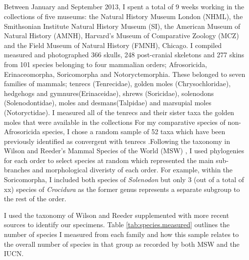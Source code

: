 \subsection{}

	Between January and September 2013, I spent a total of 9 weeks working in the collections of five museums: the Natural History Museum London (NHML), the Smithsonian Institute Natural History Museum (SI), the American Museum of Natural History (AMNH), Harvard’s Museum of Comparative Zoology (MCZ) and the Field Museum of Natural History (FMNH), Chicago. I compiled measured and photographed 366 skulls, 248 post-cranial skeletons and 277 skins from 101 species belonging to four mammalian orders; Afrosoricida, Erinaceomorpha, Soricomorpha and Notoryctemorphia. 
	These belonged to seven families of mammals; tenrecs (Tenrecidae), golden moles (Chrysochloridae), hedgehogs and gymnures(Erinaceidae), shrews (Soricidae), solenodons (Solenodontidae), moles and desmans(Talpidae) and marsupial moles (Notoryctidae).
	I measured all of the tenrecs and their sister taxa the golden moles that were available in the collections %
	For my comparative species of non-Afrosoricida species, I chose a random sample of 52 taxa %
	which have been previously identified as convergent with tenrecs \citep[e.g.][]{Gould1966, Symonds2005, Poux2008, Olson2013}.Following the taxonomy in Wilson and Reeder's Mammal Species of the World (MSW) \citeyearpar{Wilson2005}, I used phylogenies for each order to select species at random which represented the main sub-branches and morphological diveristy of each order. For example, within the Soricomorpha, I included both species of \textit{Solenodon} but only 3 %
	(out of a total of xx) species of \textit{Crocidura} as the former genus represents a separate subgroup to the rest of the order. 

	I used the taxonomy of Wilson and Reeder \citeyearpar{Wilson2005} supplemented with more recent sources \citep{IUCN2012, Olson2013} to identify our specimens. Table \ref{tab:species.measured} outlines the number of species I measured from each family and how this sample relates to the overall number of species in that group as recorded by both MSW and the IUCN.


